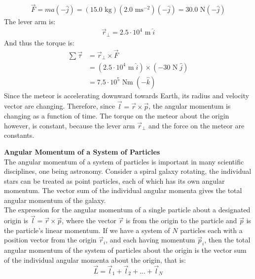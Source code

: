 \documentclass[a4paper]{article}
\let\bf\textbf
\newcommand\m{\text{ m}}
\newcommand\Nm{\text{ Nm}}
\newcommand\mss{\text{ ms}^{-2}}
\newcommand\kg{\text{ kg}}
\begin{document}
\begin{shaded}
\begin{enumerate}
        \begin{align*}
            \vec{F} = ma(-\hat{j}) = (15.0\kg)(2.0\mss)(-\hat{j}) = 30.0\text{ N}(-\hat{j})
        \end{align*}
        The lever arm is:
        \begin{align*}
            \vec{r}_{\perp} = 2.5\cdot10^4\m\;\hat{i}
        \end{align*}
        And thus the torque is:
        \begin{align*}
            \sum\vec{\tau} &= \vec{r}_{\perp}\times\vec{F}\\
            &= (2.5\cdot10^4\m\;\hat{i}) \times (-30\text{ N}\;\hat{j})\\
            &= 7.5\cdot10^5\Nm\;(-\hat{k})
        \end{align*}
        Since the meteor is accelerating downward towards Earth, its radius and velocity vector are changing. Therefore, since $\vec{l} = \vec{r} \times \vec{p}$, the angular momentum is changing as a function of time. The torque on the meteor about the origin however, is constant, because the lever arm $\vec{r}_{\perp}$ and the force on the meteor are constants.
    \end{enumerate}
\end{shaded}
\newpage
\noindent\bf{Angular Momentum of a System of Particles}
\vspace{2mm}\\
The angular momentum of a system of particles is important in many scientific disciplines, one being astronomy. Consider a spiral galaxy rotating, the individual stars can be treated as point particles, each of which has its own angular momentum. The vector sum of the individual angular momenta gives the total angular momentum of the galaxy.
\vspace{1mm}\\
The expression for the angular momentum of a single particle about a designated origin is $\vec{l} = \vec{r} \times \vec{p}$, where the vector $\vec{r}$ is from the origin to the particle and $\vec{p}$ is the particle's linear momentum. If we have a system of $N$ particles each with a position vector from the origin $\vec{r}_i$, and each having momentum $\vec{p}_i$, then the total angular momentum of the system of particles about the origin is the vector sum of the individual angular momenta about the origin, that is:
\begin{equation}
    \vec{L} = \vec{l}_1 + \vec{l}_2+ ... + \vec{l}_N
\end{equation}
\end{document}
